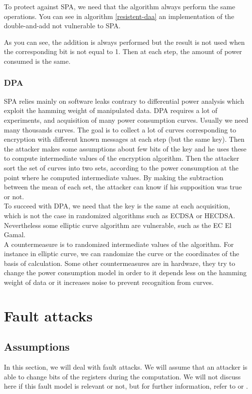 \documentclass[journal]{IEEEtran}
\begin{document}
To protect against SPA, we need that the algorithm always perform the same operations. You can see in algorithm \ref{resistent-daa} an implementation of the double-and-add not vulnerable to SPA.


As you can see, the addition is always performed but the result is not used when the corresponding bit is not equal to 1. Then at each step, the amount of power consumed is the same.\\

        \subsubsection{DPA}

SPA relies mainly on software leaks contrary to differential power analysis which exploit the hamming weight of manipulated data. DPA requires a lot of experiments, and acquisition of many power consumption curves. Usually we need many thousands curves. The goal is to collect a lot of curves corresponding to encryption with different known messages at each step (but the same key). Then the attacker makes some assumptions about few bits of the key and he uses these to compute intermediate values of the encryption algorithm. Then the attacker sort the set of curves into two sets, according to the power consumption at the point where he computed intermediate values. By making the subtraction between the mean of each set, the attacker can know if his supposition was true or not. \\

To succeed with DPA, we need that the key is the same at each acquisition, which is not the case in randomized algorithms such as ECDSA or HECDSA. Nevertheless some elliptic curve algorithm are vulnerable, such as the EC El Gamal.\\

A countermeasure is to randomized intermediate values of the algorithm. For instance in elliptic curve, we can randomize the curve or the coordinates of the basis of calculation. Some other countermeasures are  in hardware, they try to change the power consumption model in order to it depends less on the hamming weight of data or it increases noise to prevent recognition from curves.
        
\section{Fault attacks}
\label{fault}

\subsection{Assumptions}
In this section, we will deal with fault attacks. We will assume that an attacker is able to change bits of the registers
during the computation. We will not discuss here if this fault model is relevant or not, but for further information, 
refer to \cite{bar2006sorcerer} or \cite{giraud2004survey}.
\end{document}

